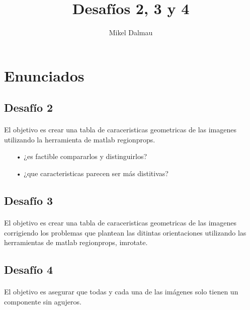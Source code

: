 \documentclass[es,gi]{ifirak}\usepackage[]{graphicx}\usepackage[]{color}
\begin{document}
\title{Desafíos 2, 3 y 4}
\author{Mikel Dalmau}

\maketitle




\section{Enunciados}

\subsection{Desafío 2}
\paragraph{}
El objetivo es crear una tabla de caraceristicas geometricas de las imagenes utilizando la herramienta de matlab regionprops.

\begin{itemize}
\item[•] ¿es factible compararlos y distinguirlos?
\item[•] ¿que caracteristicas parecen ser más distitivas?
\end{itemize}

\subsection{Desafío 3}
\paragraph{}
El objetivo es crear una tabla de caraceristicas geometricas de las imagenes corrigiendo los problemas que plantean las ditintas orientaciones utilizando las herramientas de matlab regionprops, imrotate.

\subsection{Desafío 4}
\paragraph{}
El objetivo es asegurar que todas y cada una de las imágenes solo tienen un componente sin agujeros.
\end{document}
